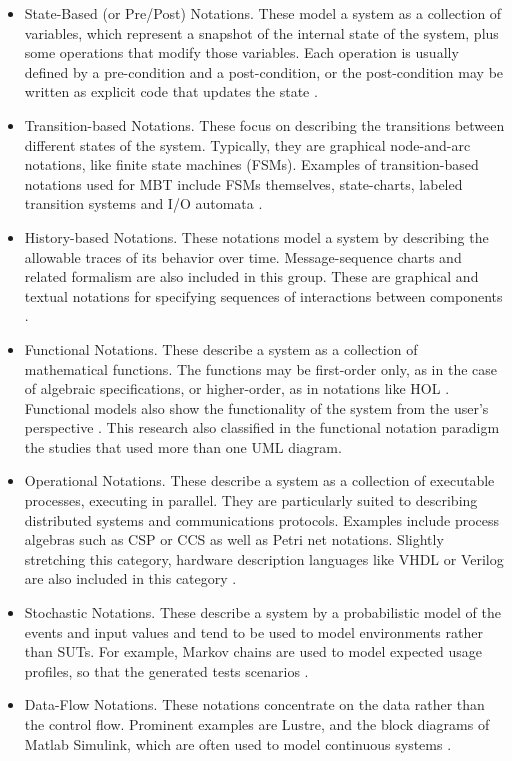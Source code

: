 \documentclass[espaco=umemeio,chapter=TITLE,twoside,openright]{abnt}
\begin{document}
\begin{itemize}
\item State-Based (or Pre/Post) Notations. These model a system as a collection of variables, which represent a snapshot of the internal state of the system, plus some operations that modify those variables. Each operation is usually defined by a pre-condition and a post-condition, or the post-condition may be written as explicit code that updates the state \cite{MarkUtting2012}.
\item Transition-based Notations. These focus on describing the transitions between different states
of the system. Typically, they are graphical node-and-arc notations, like finite state machines
(FSMs). Examples of transition-based notations used for MBT include FSMs themselves, state-charts, labeled transition systems and I/O automata \cite{MarkUtting2012}.
\item History-based Notations. These notations model a system by describing the allowable traces
of its behavior over time. Message-sequence charts and related formalism are also included in this group. These are
graphical and textual notations for specifying sequences of interactions between components \cite{MarkUtting2012}.
\item Functional Notations. These describe a system as a collection of mathematical functions. The
functions may be first-order only, as in the case of algebraic specifications, or higher-order, as in
notations like HOL \cite{MarkUtting2012}. Functional models also show the functionality of the system from the user’s perspective \cite{Ye2007}. This research also classified in the functional notation paradigm the studies that used more than one UML diagram. 
\item Operational Notations. These describe a system as a collection of executable processes,
executing in parallel. They are particularly suited to describing distributed systems and
communications protocols. Examples include process algebras such as CSP or CCS as well as
Petri net notations. Slightly stretching this category, hardware description languages like VHDL
or Verilog are also included in this category \cite{MarkUtting2012}.
\item Stochastic Notations. These describe a system by a probabilistic model of the events and input
values and tend to be used to model environments rather than SUTs. For example, Markov chains
are used to model expected usage profiles, so that the generated tests scenarios \cite{MarkUtting2012}.
\item Data-Flow Notations. These notations concentrate on the data rather than the control flow.
Prominent examples are Lustre, and the block diagrams of Matlab Simulink, which are often used
to model continuous systems \cite{MarkUtting2012}.
\end{itemize}
\end{document}

